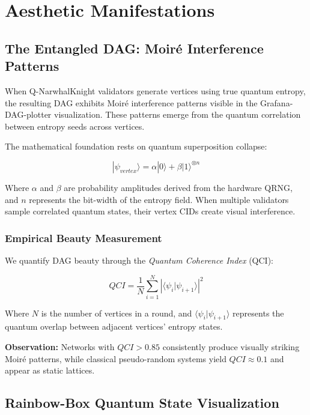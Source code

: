 \documentclass[12pt,a4paper]{article}
\begin{document}
\section{Aesthetic Manifestations}

\subsection{The Entangled DAG: Moiré Interference Patterns}

When Q-NarwhalKnight validators generate vertices using true quantum entropy, the resulting DAG exhibits Moiré interference patterns visible in the Grafana-DAG-plotter visualization. These patterns emerge from the quantum correlation between entropy seeds across vertices.

The mathematical foundation rests on quantum superposition collapse:

\begin{equation}
|\psi_{vertex}\rangle = \alpha|0\rangle + \beta|1\rangle^{\otimes n}
\end{equation}

Where $\alpha$ and $\beta$ are probability amplitudes derived from the hardware QRNG, and $n$ represents the bit-width of the entropy field. When multiple validators sample correlated quantum states, their vertex CIDs create visual interference.

\subsubsection{Empirical Beauty Measurement}

We quantify DAG beauty through the \textit{Quantum Coherence Index} (QCI):

\begin{equation}
QCI = \frac{1}{N} \sum_{i=1}^{N} \left| \langle \psi_i | \psi_{i+1} \rangle \right|^2
\end{equation}

Where $N$ is the number of vertices in a round, and $\langle \psi_i | \psi_{i+1} \rangle$ represents the quantum overlap between adjacent vertices' entropy states.

\textbf{Observation:} Networks with $QCI > 0.85$ consistently produce visually striking Moiré patterns, while classical pseudo-random systems yield $QCI \approx 0.1$ and appear as static lattices.

\subsection{Rainbow-Box Quantum State Visualization}
\end{document}
